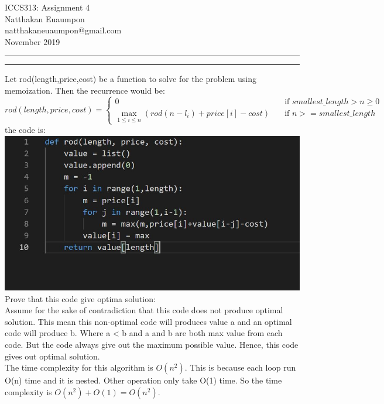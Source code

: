 \documentclass[a4paper, 11pt]{article}
\makeatletter
\newcommand{\question}[2] {\vspace{.25in} \hrule\vspace{0.5em}
\noindent{\bf #1: #2} \vspace{0.5em}
\hrule \vspace{.10in}}
\newcommand{\myname}{Natthakan Euaumpon}
\newcommand{\myemail}{natthakaneuaumpon@gmail.com}
\newcommand{\myhwnum}{4}
\makeatother
\begin{document}
\medskip                        %

\thispagestyle{plain}
\begin{center}                  %
{\Large ICCS313: Assignment \myhwnum} \\
\myname \\
\myemail \\
November 2019 \\
\end{center}
\question{1}{problem1}
Let rod(length,price,cost) be a function to solve for the problem using memoization. Then the recurrence would be:\\
\[
rod(length,price,cost) = 
\begin{cases}
0       & \quad \text{if } smallest\_length > n \geq 0\\
\max\limits_{1\leq i \leq n}(rod(n-l_i)+price[i]-cost)     & \quad \text{if } n >= smallest\_length
\end{cases}
\]
the code is:\\
\includegraphics[width=\textwidth]{rod.jpg}\\
Prove that this code give optima solution:\\
Assume for the sake of contradiction that this code does not produce optimal solution. This mean this non-optimal code will produces value a and an optimal code will produce b. Where a < b and a and b are both max value from each code. But the code always give out the maximum possible value. Hence, this code gives out optimal solution.\\
The time complexity for this algorithm is $O(n^{2})$. This is because each loop run O(n) time and it is nested. Other operation only take O(1) time. So the time complexity is $O(n^{2})+O(1) = O(n^{2})$.
\end{document}
